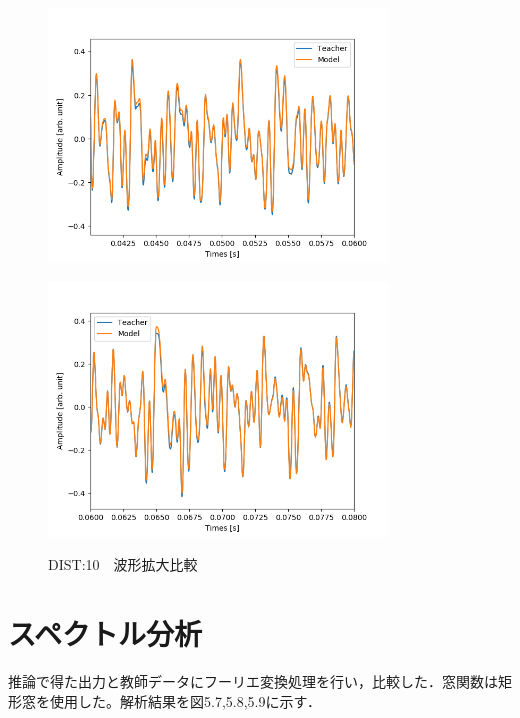 \documentclass{jreport}		%
\begin{document}
\begin{figure}[htbp]
 \begin{minipage}{0.5\hsize}
 \begin{center}
  \includegraphics[width=90mm]{gain10_output_hikaku3.png}
 \end{center}
 \label{fig:one}
 \end{minipage}
 \begin{minipage}{0.5\hsize}
 \begin{center}
  \includegraphics[width=90mm]{gain10_output_hikaku4.png}
 \end{center}
 \label{fig:two}
 \end{minipage}
 \caption{DIST:10　波形拡大比較}
\end{figure}

\clearpage

\section{スペクトル分析}
推論で得た出力と教師データにフーリエ変換処理を行い，比較した．窓関数は矩形窓を使用した。解析結果を図5.7,5.8,5.9に示す．
\end{document}
